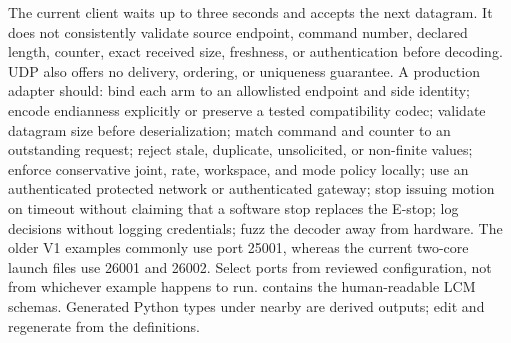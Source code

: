 {}The current client waits up to three seconds and accepts the next datagram. It does not consistently validate source endpoint, command number, declared length, counter, exact received size, freshness, or authentication before decoding. UDP also offers no delivery, ordering, or uniqueness guarantee.\markdownRendererParagraphSeparator
{}A production adapter should:\markdownRendererInterblockSeparator
{}\markdownRendererOlBegin
{}bind each arm to an allowlisted endpoint and side identity;\markdownRendererOlItemEnd 
{}encode endianness explicitly or preserve a tested compatibility codec;\markdownRendererOlItemEnd 
{}validate datagram size before deserialization;\markdownRendererOlItemEnd 
{}match command and counter to an outstanding request;\markdownRendererOlItemEnd 
{}reject stale, duplicate, unsolicited, or non-finite values;\markdownRendererOlItemEnd 
{}enforce conservative joint, rate, workspace, and mode policy locally;\markdownRendererOlItemEnd 
{}use an authenticated protected network or authenticated gateway;\markdownRendererOlItemEnd 
{}stop issuing motion on timeout without claiming that a software stop replaces the E-stop;\markdownRendererOlItemEnd 
{}log decisions without logging credentials;\markdownRendererOlItemEnd 
{}fuzz the decoder away from hardware.\markdownRendererOlItemEnd 
\markdownRendererOlEnd \markdownRendererInterblockSeparator
{}The older V1 examples commonly use port 25001, whereas the current two-core launch files use 26001 and 26002. Select ports from reviewed configuration, not from whichever example happens to run.\markdownRendererInterblockSeparator
{}
\markdownRendererSectionEnd 
\markdownRendererSectionEnd \markdownRendererSectionBegin
{}\markdownRendererInterblockSeparator
{}\markdownRendererBlockQuoteBegin
{}  contains the human-readable LCM schemas. Generated Python types under nearby  are derived outputs; edit and regenerate from the  definitions.\markdownRendererBlockQuoteEnd \markdownRendererInterblockSeparator
